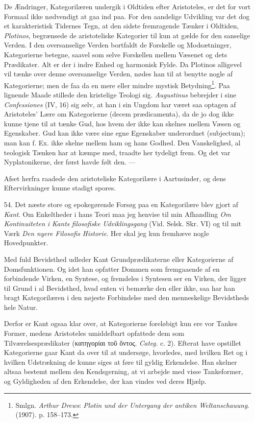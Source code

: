 \documentclass[12pt,a4paper]{book}
\newcommand{\apage}[1]{\marginnote{\footnotesize\textit{[#1]}}}
\begin{document}
De Ændringer, Kategorilæren undergik i Oldtiden efter Aristoteles, er det
for vort Formaal ikke nødvendigt at gaa ind paa. For den aandelige
Udvikling var det dog et karakteristisk Tidernes Tegn, at den sidste
fremragende Tænker i Oldtiden, \emph{Plotinos}, begrænsede de
aristoteliske Kategorier til kun at gælde for den sanselige Verden. I den
oversanselige Verden bortfaldt de Forskelle og Modsætninger, Kategorierne
betegne, saavel som selve Forskellen mellem Væsenet og dets Prædikater.
Alt er der i indre Enhed og harmonisk Fylde. Da Plotinos alligevel vil
tænke over denne oversanselige Verden, nødes han til at benytte nogle af Kategorierne; men de faa da en mere eller mindre mystisk
Betydning\footnote{Smlgn. \emph{Arthur Drews}: \emph{Plotin und der
Untergang der antiken Weltanschauung}. (1907). p. 158--173.}. Paa
lignende Maade stillede den kristelige Teologi sig. \emph{Augustinus}
bebrejder i sine \emph{Confessiones} (IV, 16) sig selv, at han i sin
Ungdom har været saa optagen af Aristoteles' Lære om Kategorierne (decem
prædicamenta), da de jo dog ikke kunne tjene til at tænke Gud, hos hvem
der ikke kan skelnes mellem Væsen og Egenskaber. Gud kan ikke være sine
egne Egenskaber underordnet (subjectum); man kan f. Ex. ikke skelne
mellem ham og hans Godhed. Den Vanskelighed, al teologisk Tænken har at
kæmpe med, traadte her tydeligt frem. Og det var Nyplatonikerne, der
først havde følt den. ---

Afset herfra raadede den aristoteliske Kategorilære i Aartusinder, og
dens Eftervirkninger kunne stadigt spores.

\apage{144} 54. Det næste store og epokegørende Forsøg paa en Kategorilære blev gjort
af \emph{Kant}. Om Enkeltheder i hans Teori maa jeg henvise til min
Afhandling \emph{Om Kontinuiteten i Kants filosofiske Udviklingsgang}
(Vid. Selsk. Skr. VI) og til mit Værk \emph{Den nyere Filosofis
Historie}. Her skal jeg kun fremhæve nogle Hovedpunkter.

Med fuld Bevidsthed udleder Kant Grundprædikaterne eller Kategorierne af
Domsfunktionen. Og idet han opfatter Dommen som fremgaaende af en
forbindende Virken, en Syntese, og fremdeles i Syntesen ser en Virken,
der ligger til Grund i al Bevidsthed, hvad enten vi bemærke den eller
ikke, saa har han bragt Kategorilæren i den nøjeste Forbindelse med den
menneskelige Bevidstheds hele Natur.

Derfor er Kant ogsaa klar over, at Kategorierne foreløbigt kun ere vor
Tankes Former, medens Aristoteles umiddelbart opfattede dem som
Tilværelsesprædikater (κατηγορίαι τοῦ ὄντος. \emph{Categ.} c. 2). Efterat
have opstillet Kategorierne gaar Kant da over til at undersøge,
hvorledes, med hvilken Ret og i hvilken Udstrækning de kunne siges at
føre til gyldig Erkendelse. Han skelner altsaa bestemt mellem den
Kendsgerning, at vi arbejde med visse Tankeformer, og Gyldigheden af den
Erkendelse, der kan vindes ved deres Hjælp.
\end{document}
